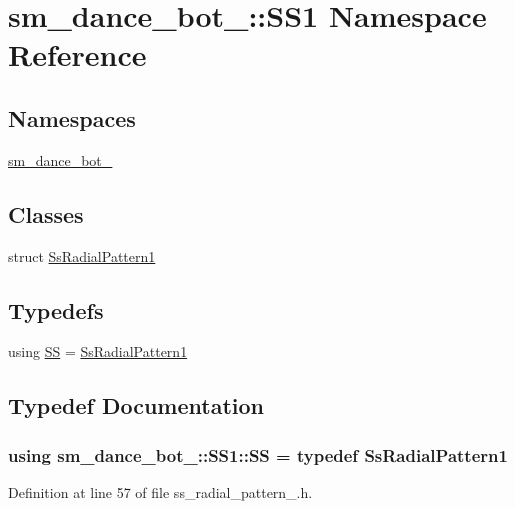 \hypertarget{namespacesm__dance__bot__3_1_1SS1}{}\section{sm\+\_\+dance\+\_\+bot\+\_\+:\+:S\+S1 Namespace Reference}
\label{namespacesm__dance__bot__3_1_1SS1}
\subsection*{Namespaces}
\begin{DoxyCompactItemize}
\item 
 \hyperlink{namespacesm__dance__bot__3_1_1SS1_1_1sm__dance__bot__3}{sm\+\_\+dance\+\_\+bot\+\_}
\end{DoxyCompactItemize}
\subsection*{Classes}
\begin{DoxyCompactItemize}
\item 
struct \hyperlink{structsm__dance__bot__3_1_1SS1_1_1SsRadialPattern1}{Ss\+Radial\+Pattern1}
\end{DoxyCompactItemize}
\subsection*{Typedefs}
\begin{DoxyCompactItemize}
\item 
using \hyperlink{namespacesm__dance__bot__3_1_1SS1_aa6a573d7866d8b69696b0c840eadc8fc}{SS} = \hyperlink{structsm__dance__bot__3_1_1SS1_1_1SsRadialPattern1}{Ss\+Radial\+Pattern1}
\end{DoxyCompactItemize}


\subsection{Typedef Documentation}
\subsubsection[{\texorpdfstring{SS}{SS}}]{\setlength{\rightskip}{0pt plus 5cm}using {\bf sm\+\_\+dance\+\_\+bot\+\_\+::\+S\+S1\+::\+SS} = typedef {\bf Ss\+Radial\+Pattern1}}\hypertarget{namespacesm__dance__bot__3_1_1SS1_aa6a573d7866d8b69696b0c840eadc8fc}{}\label{namespacesm__dance__bot__3_1_1SS1_aa6a573d7866d8b69696b0c840eadc8fc}


Definition at line 57 of file ss\+\_\+radial\+\_\+pattern\+\_.\+h.

